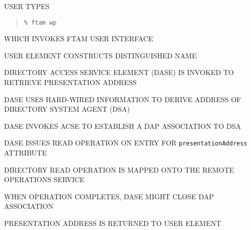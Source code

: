 \begin{bwslide}

\begin{nrtc}
\item	USER TYPES
\begin{quote}\small\begin{verbatim}
% ftam wp
\end{verbatim}\end{quote}
	WHICH INVOKES FTAM USER INTERFACE

\item	USER ELEMENT CONSTRUCTS DISTINGUISHED NAME
\end{nrtc}
\end{bwslide}




\begin{bwslide}

\begin{nrtc}
\item	DIRECTORY ACCESS SERVICE ELEMENT (DASE) IS INVOKED TO RETRIEVE
	PRESENTATION ADDRESS

\item	DASE USES HARD-WIRED INFORMATION TO DERIVE ADDRESS OF DIRECTORY SYSTEM
	AGENT (DSA)

\item	DASE INVOKES ACSE TO ESTABLISH A DAP ASSOCIATION TO DSA
\end{nrtc}
\end{bwslide}


\begin{bwslide}

\begin{nrtc}
\item	DASE ISSUES READ OPERATION ON ENTRY FOR \verb"presentationAddress"
	ATTRIBUTE

\item	DIRECTORY READ OPERATION IS MAPPED ONTO THE REMOTE OPERATIONS SERVICE

\item	WHEN OPERATION COMPLETES, DASE MIGHT CLOSE DAP ASSOCIATION

\item	PRESENTATION ADDRESS IS RETURNED TO USER ELEMENT
\end{nrtc}
\end{bwslide}


